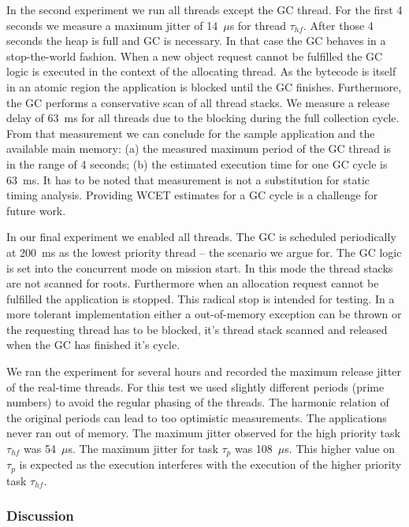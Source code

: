 In the second experiment we run all threads except the GC thread.
For the first 4 seconds we measure a maximum jitter of 14~$\mu$s for
thread $\tau_{hf}$. After those 4 seconds the heap is full and GC is
necessary. In that case the GC behaves in a stop-the-world fashion.
When a new object request cannot be fulfilled the GC logic is
executed in the context of the allocating thread. As the bytecode
 is itself in an atomic region the application is blocked
until the GC finishes. Furthermore, the GC performs a conservative
scan of all thread stacks. We measure a release delay of 63~ms for
all threads due to the blocking during the full collection cycle.
From that measurement we can conclude for the sample application and
the available main memory: (a) the measured maximum period of the GC
thread is in the range of 4 seconds; (b) the estimated execution
time for one GC cycle is 63~ms. It has to be noted that measurement
is not a substitution for static timing analysis. Providing WCET
estimates for a GC cycle is a challenge for future work.

In our final experiment we enabled all threads. The GC is scheduled
periodically at 200~ms as the lowest priority thread -- the scenario
we argue for. The GC logic is set into the concurrent mode on
mission start. In this mode the thread stacks are not scanned for
roots. Furthermore when an allocation request cannot be fulfilled
the application is stopped. This radical stop is intended for
testing. In a more tolerant implementation either a out-of-memory
exception can be thrown or the requesting thread has to be blocked,
it's thread stack scanned and released when the GC has finished it's
cycle.

We ran the experiment for several hours and recorded the maximum
release jitter of the real-time threads. For this test we used
slightly different periods (prime numbers) to avoid the regular
phasing of the threads. The harmonic relation of the original
periods can lead to too optimistic measurements. The applications
never ran out of memory. The maximum jitter observed for the high
priority task $\tau_{hf}$ was 54~$\mu$s. The maximum jitter for task
$\tau_{p}$ was 108~$\mu$s. This higher value on $\tau_{p}$ is
expected as the execution interferes with the execution of the
higher priority task $\tau_{hf}$.

\subsubsection{Discussion}


